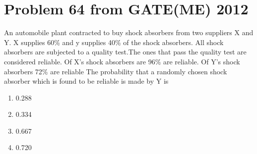 \documentclass[journal,12pt,twocolumn]{IEEEtran}
\begin{document}
\section{\textbf{Problem 64 from GATE(ME) 2012}}
An automobile plant contracted to buy shock absorbers from two suppliers X and Y. X supplies 60\% and y supplies 40\% of the shock absorbers. All shock absorbers are subjected to a quality test.The ones that pass the quality test are considered reliable. Of X's shock absorbers are 96\% are reliable. Of Y's shock absorbers 72\% are reliable The probability that a randomly chosen shock absorber which is found to be reliable is made by Y is
\begin{enumerate}
    \item 0.288
    \item 0.334
    \item 0.667
    \item 0.720
\end{enumerate}
\end{document}
